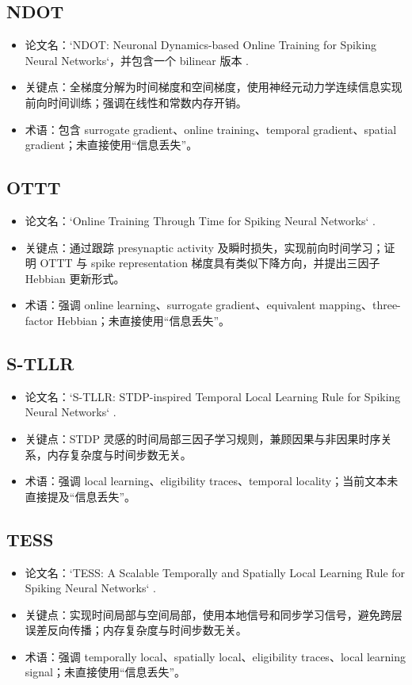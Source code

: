 \documentclass[journal,12pt,onecolumn]{IEEEtran}
\begin{document}
\subsection{NDOT}
\begin{itemize}
  \item 论文名：`NDOT: Neuronal Dynamics-based Online Training for Spiking Neural Networks`，并包含一个 bilinear 版本 \cite{jiang2024ndot}.\
  \item 关键点：全梯度分解为时间梯度和空间梯度，使用神经元动力学连续信息实现前向时间训练；强调在线性和常数内存开销。\
  \item 术语：包含 surrogate gradient、online training、temporal gradient、spatial gradient；未直接使用“信息丢失”。\
\end{itemize}

\subsection{OTTT}
\begin{itemize}
  \item 论文名：`Online Training Through Time for Spiking Neural Networks` \cite{xiao2022online}.\
  \item 关键点：通过跟踪 presynaptic activity 及瞬时损失，实现前向时间学习；证明 OTTT 与 spike representation 梯度具有类似下降方向，并提出三因子 Hebbian 更新形式。\
  \item 术语：强调 online learning、surrogate gradient、equivalent mapping、three-factor Hebbian；未直接使用“信息丢失”。\
\end{itemize}

\subsection{S-TLLR}
\begin{itemize}
  \item 论文名：`S-TLLR: STDP-inspired Temporal Local Learning Rule for Spiking Neural Networks` \cite{apolinario2023s}.\
  \item 关键点：STDP 灵感的时间局部三因子学习规则，兼顾因果与非因果时序关系，内存复杂度与时间步数无关。\
  \item 术语：强调 local learning、eligibility traces、temporal locality；当前文本未直接提及“信息丢失”。\
\end{itemize}

\subsection{TESS}
\begin{itemize}
  \item 论文名：`TESS: A Scalable Temporally and Spatially Local Learning Rule for Spiking Neural Networks` \cite{apolinario2025tess}.\
  \item 关键点：实现时间局部与空间局部，使用本地信号和同步学习信号，避免跨层误差反向传播；内存复杂度与时间步数无关。\
  \item 术语：强调 temporally local、spatially local、eligibility traces、local learning signal；未直接使用“信息丢失”。\
\end{itemize}
\end{document}
